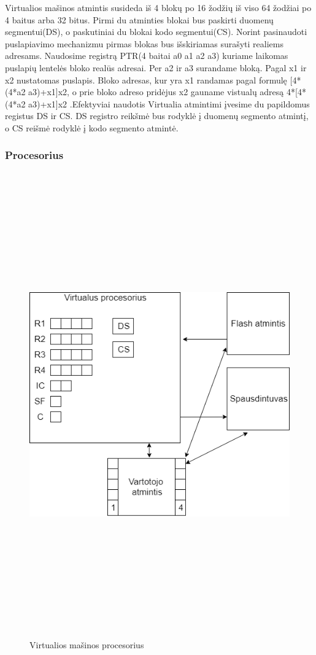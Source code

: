 \documentclass[oneside]{VUMIFPSkursinis}
\begin{document}
	Virtualios mašinos atmintis susideda iš 4 blokų po 16 žodžių iš viso 64 žodžiai po 4 baitus arba 32 bitus. Pirmi du atminties blokai bus paskirti duomenų segmentui(DS), o paskutiniai du blokai kodo segmentui(CS). Norint pasinaudoti puslapiavimo mechanizmu pirmas blokas bus išskiriamas surašyti realiems adresams. Naudosime registrą PTR(4 baitai a0 a1 a2 a3) kuriame laikomas puslapių lentelės bloko realūs adresai. Per a2 ir a3 surandame bloką. Pagal x1 ir x2 nustatomas puslapis. Bloko adresas, kur yra x1 randamas pagal formulę [4*(4*a2 a3)+x1]x2, o prie bloko adreso pridėjus x2 gauname vistualų adresą 4*[4*(4*a2 a3)+x1]x2 .Efektyviai naudotis Virtualia atmintimi įvesime du papildomus registus DS ir CS. DS registro reikšmė bus rodyklė į duomenų segmento atmintį, o CS reišmė rodyklė į kodo segmento atmintė.

	\subsubsection{Procesorius}
\begin{figure}[H]
		\centering	
	\includegraphics[width=18cm,height=20cm,keepaspectratio]{VMProcesorius.png}
	\caption{Virtualios mašinos procesorius}
	\label{fig:Virtualios mašinos procesorius}
\end{figure}
\end{document}
